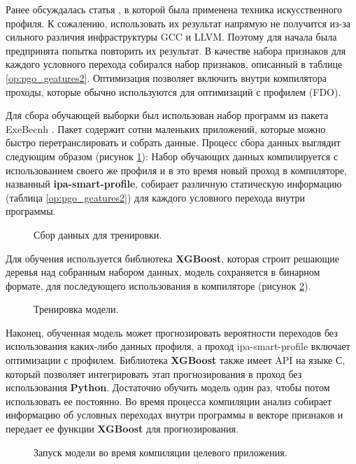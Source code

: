 Ранее обсуждалась статья  \cite{rotem2021profile}, в которой была применена техника искусственного профиля. К сожалению, использовать их результат напрямую не получится из-за сильного различия инфраструктуры  GCC и LLVM. Поэтому для начала была предпринята попытка повторить их результат. В качестве набора признаков для каждого условного перехода собирался набор признаков, описанный в таблице \ref{op:pgo_geatures2}. Оптимизация позволяет включить внутри компилятора проходы, которые обычно используются для оптимизаций с профилем (FDO).

Для сбора обучающей выборки был использован набор программ из пакета ExeBecnh \cite{armengol2022exebench}. Пакет содержит сотни маленьких приложений, которые можно быстро перетранслировать и собрать данные. Процесс сбора данных выглядит следующим образом (рисунок \ref{op:mlpgo1}): Набор обучающих данных компилируется  с использованием своего же профиля и в это время новый проход в компиляторе, названный \textbf{ipa-smart-profile}, собирает различную статическую информацию (таблица \ref{op:pgo_geatures2}) для каждого условного перехода внутри программы. 

\begin{figure}[htbp]
	\centering
	
	\caption{Сбор данных для тренировки.}
	\label{op:mlpgo1}
\end{figure}

Для обучения используется библиотека \textbf{XGBoost}, которая строит решающие деревья над собранным набором данных, модель сохраняется в бинарном формате, для последующего использования в компиляторе (рисунок \ref{op:mlpgo2}).

\begin{figure}[htbp]
	\centering
	
	\caption{Тренировка модели.}
	\label{op:mlpgo2}
\end{figure}
Наконец, обученная модель может прогнозировать вероятности  переходов  без использования каких-либо данных профиля, а проход ipa-smart-profile включает оптимизации с профилем. Библиотека \textbf{XGBoost} также имеет API на языке С, который позволяет интегрировать этап прогнозирования в проход без использования \textbf{Python}. Достаточно обучить модель один раз, чтобы потом использовать ее постоянно. Во время процесса компиляции анализ собирает информацию об условных переходах  внутри программы в векторе признаков и передает ее функции \textbf{XGBoost} для прогнозирования.
\begin{figure}[htbp]
	\centering
	
	\caption{Запуск модели во время компиляции целевого приложения.}
	\label{op:mlpgo3}
\end{figure}



